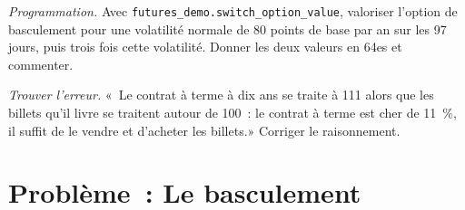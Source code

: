 \begin{exercise}[$\star\star\star$]\label{exo:m2:bond-futures:7}
\emph{Programmation.} Avec \texttt{futures\_demo.switch\_option\_value}, valoriser
l'option de basculement pour une volatilité normale de 80 points de base par an sur les 97
jours, puis trois fois cette volatilité. Donner les deux valeurs en 64es et commenter.
\end{exercise}

\begin{exercise}[$\star\star\star$]\label{exo:m2:bond-futures:8}
\emph{Trouver l'erreur.} «~Le contrat à terme à dix ans se traite à 111 alors que les billets qu'il
livre se traitent autour de 100~: le contrat à terme est cher de 11~\%, il suffit de le vendre et d'acheter les
billets.» Corriger le raisonnement.
\end{exercise}

\section{Problème~: Le basculement}

